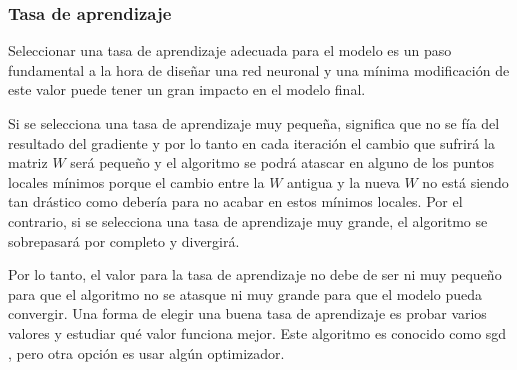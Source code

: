 \subsubsection{Tasa de aprendizaje}\label{learningrate}
Seleccionar una tasa de aprendizaje adecuada para el modelo es un paso fundamental a la hora de diseñar una red neuronal y una mínima modificación de este valor puede tener un gran impacto en el modelo final. 
\newline

Si se selecciona una tasa de aprendizaje muy pequeña, significa que no se fía del resultado del gradiente y por lo tanto en cada iteración el cambio que sufrirá la matriz $W$ será pequeño y el algoritmo se podrá atascar en alguno de los puntos locales mínimos porque el cambio entre la $W$ antigua y la nueva $W$ no está siendo tan drástico como debería para no acabar en estos mínimos locales. Por el contrario, si se selecciona una tasa de aprendizaje muy grande, el algoritmo se sobrepasará por completo y divergirá.
\newline

Por lo tanto, el valor para la tasa de aprendizaje no debe de ser ni muy pequeño para que el algoritmo no se atasque ni muy grande para que el modelo pueda convergir. Una forma de elegir una buena tasa de aprendizaje es probar varios valores y estudiar qué valor funciona mejor. Este algoritmo es conocido como \acrfull{sgd} \cite{kiefer}, pero otra opción es usar algún optimizador.
\newline